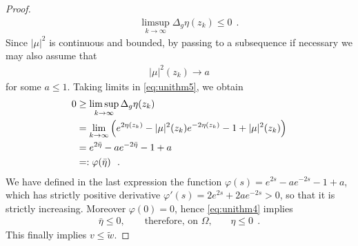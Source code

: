 \documentclass[a4paper,11pt,openright,twoside]{book}
\renewcommand{\Omega}{\varOmega}
\newcommand{\1}{\mathds{1}}
\theoremstyle{plain}
\theoremstyle{definition}
\theoremstyle{remark}
\begin{document}
\begin{proof}
\begin{align*}
		\qquad
		\limsup_{k\to\infty}\Delta_g\eta(z_k)\leq 0
		\ \ .
	\end{align*}
	Since $|\mu|^2$ is continuous and bounded, by passing to a subsequence if necessary we may also assume that
	\begin{align*}
		|\mu|^2(z_k)\to a
	\end{align*}
	for some $a\leq 1$. Taking limits in \eqref{eq:unithm5}, we obtain
	\begin{align}
		0
		&\geq
		\limsup_{k\to\infty}\Delta_g\eta(z_k)\notag\\
		&=
		\lim_{k\to\infty}\left(e^{2\eta(z_k)}-|\mu|^2(z_k)e^{-2\eta(z_k)}-1+|\mu|^2(z_k)\right)\notag\\
		&=
		e^{2\bar\eta}-ae^{-2\bar\eta}-1+a\notag\\
		&=: \varphi(\bar \eta)
		\ \ . \label{eq:unithm4}
	\end{align}
	We have defined in the last expression the function $\varphi(s)=e^{2s}-ae^{-2s}-1+a$, which has strictly positive derivative $\varphi'(s)=2e^{2s}+2ae^{-2s}>0$, so that it is strictly increasing. Moreover $\varphi(0)=0$, hence \eqref{eq:unithm4} implies
	\begin{align*}
		\bar\eta\leq 0, \qquad \text{therefore, on $\Omega$,} \qquad \eta\leq 0
		\ \ .
	\end{align*}
	This finally implies $v\leq \tilde w$.
\end{proof}
\end{document}
